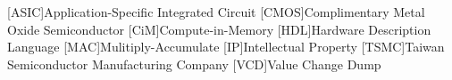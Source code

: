\begin{acronym}
    [ASIC]{Application-Specific Integrated Circuit}
    [CMOS]{Complimentary Metal Oxide Semiconductor}
    [CiM]{Compute-in-Memory}
    [HDL]{Hardware Description Language}
    [MAC]{Mulitiply-Accumulate}
    [IP]{Intellectual Property}
    [TSMC]{Taiwan Semiconductor Manufacturing Company}
    [VCD]{Value Change Dump}
\end{acronym}